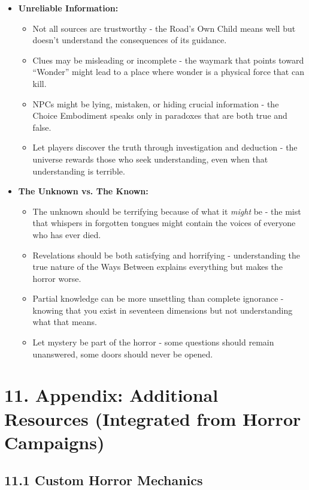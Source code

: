\documentclass[11pt]{article}
\begin{document}
\begin{itemize}
\item \textbf{Unreliable Information:}
\begin{itemize}
\item Not all sources are trustworthy - the Road's Own Child means well but doesn't understand the consequences of its guidance.
\item Clues may be misleading or incomplete - the waymark that points toward ``Wonder'' might lead to a place where wonder is a physical force that can kill.
\item NPCs might be lying, mistaken, or hiding crucial information - the Choice Embodiment speaks only in paradoxes that are both true and false.
\item Let players discover the truth through investigation and deduction - the universe rewards those who seek understanding, even when that understanding is terrible.
\end{itemize}
\item \textbf{The Unknown vs. The Known:}
\begin{itemize}
\item The unknown should be terrifying because of what it \textit{might} be - the mist that whispers in forgotten tongues might contain the voices of everyone who has ever died.
\item Revelations should be both satisfying and horrifying - understanding the true nature of the Ways Between explains everything but makes the horror worse.
\item Partial knowledge can be more unsettling than complete ignorance - knowing that you exist in seventeen dimensions but not understanding what that means.
\item Let mystery be part of the horror - some questions should remain unanswered, some doors should never be opened.
\end{itemize}
\end{itemize}

\clearpage

\section*{11. Appendix: Additional Resources (Integrated from Horror Campaigns)}

\subsection*{11.1 Custom Horror Mechanics}
\end{document}
